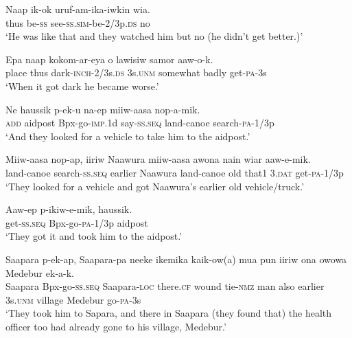 \ea\label{ex:a:x22}
\gll  Naap  ik-ok  uruf-am-ika-iwkin  wia. \\
thus  be-\textsc{ss}  see-\textsc{ss}.\textsc{sim}-be-2/3p.\textsc{ds}  no \\
\glt ‘He was like that and they watched him but no (he didn’t get better.)’ \\
\z


\ea\label{ex:a:x23}
\gll  Epa  naap  kokom-ar-eya  o  lawisiw  samor         aaw-o-k. \\
place  thus  dark-\textsc{inch}-2/3s.\textsc{ds}  3s.\textsc{unm}  somewhat  badly  get-\textsc{pa}-3s \\


\glt ‘When it got dark he became worse.’ \\
\z


\ea\label{ex:a:x24}
\gll  Ne  haussik  p-ek-u  na-ep  miiw-aasa  nop-a-mik. \\
\textsc{add}  aidpost  Bpx-go-\textsc{imp}.1d  say-\textsc{ss.seq}  land-canoe  search-\textsc{pa}-1/3p \\
\glt ‘And they looked for a vehicle to take him to the aidpost.’ \\
\z


\ea\label{ex:a:x25}
\gll  Miiw-aasa  nop-ap,  iiriw  Naawura  miiw-aasa  awona  nain     wiar  aaw-e-mik. \\
land-canoe  search-\textsc{ss.seq}  earlier  Naawura  land-canoe  old  that1  3.\textsc{dat}  get-\textsc{pa}-1/3p \\


\glt ‘They looked for a vehicle and got Naawura’s earlier old vehicle/truck.’ \\
\z


\ea\label{ex:a:x26}
\gll  Aaw-ep  p-ikiw-e-mik,  haussik. \\
get-\textsc{ss.seq}  Bpx-go-\textsc{pa}-1/3p  aidpost \\
\glt ‘They got it and took him to the aidpost.’ \\
\z


\ea\label{ex:a:x27}
\gll  Saapara  p-ek-ap,  Saapara-pa  neeke  ikemika  kaik-ow(a) mua  pun  iiriw  ona  owowa  Medebur  ek-a-k. \\
Saapara  Bpx-go-\textsc{ss.seq}  Saapara-\textsc{loc}  there.\textsc{cf}  wound  tie-\textsc{nmz}   man  also  earlier  3s.\textsc{unm}  village  Medebur  go-\textsc{pa}-3s \\


\glt ‘They took him to Sapara, and there in Saapara (they found that) the health officer too had already gone to his village, Medebur.’ \\
\z


